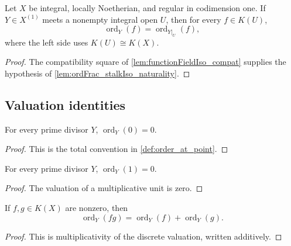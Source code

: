 \begin{lemma}
  \label{lem:order_eq_order_restrict}
  \leanok

  Let \(X\) be integral, locally Noetherian, and regular in codimension one.
  If \(Y\in X^{(1)}\) meets a nonempty integral open \(U\), then for every
  \(f\in K(U)\),
  \[
    \operatorname{ord}_Y(f)
      =\operatorname{ord}_{Y|_U}(f),
  \]
  where the left side uses \(K(U)\cong K(X)\).
\end{lemma}
\begin{proof}
  \leanok
  The compatibility square of \cref{lem:functionFieldIso_compat} supplies
  the hypothesis of \cref{lem:ordFrac_stalkIso_naturality}.
\end{proof}

\subsection{Valuation identities}
\label{subsec:order_identities}

\begin{lemma}
  \label{lem:order_zero}
  \leanok
  For every prime divisor \(Y\), \(\operatorname{ord}_Y(0)=0\).
\end{lemma}
\begin{proof}
  \leanok
  This is the total convention in \cref{def:order_at_point}.
\end{proof}

\begin{lemma}
  \label{lem:order_one}
  \leanok
  For every prime divisor \(Y\), \(\operatorname{ord}_Y(1)=0\).
\end{lemma}
\begin{proof}
  \leanok
  The valuation of a multiplicative unit is zero.
\end{proof}

\begin{lemma}
  \label{lem:order_mul_of_ne_zero}
  \leanok
  If \(f,g\in K(X)\) are nonzero, then
  \[
    \operatorname{ord}_Y(fg)
      =\operatorname{ord}_Y(f)+\operatorname{ord}_Y(g).
  \]
\end{lemma}
\begin{proof}
  \leanok
  This is multiplicativity of the discrete valuation, written additively.
\end{proof}

